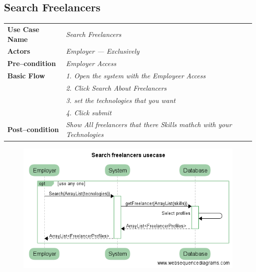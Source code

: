 \documentclass{article}
\begin{document}
\subsection{Search Freelancers}
    \begin{tabular}{ l | l }
    \toprule
      \rowcolor{LightCyan}
      \textbf{Use Case Name}    & \textit{Search Freelancers}\\
      \textbf{Actors}           & \textit{Employer --- Exclusively}\\
      \rowcolor{LightCyan}
      \textbf{Pre--condition}   & \textit{Employer Access}\\
      \textbf{Basic Flow}       & \textit{1. Open the system with the Employeer Access}\\
                                & \textit{2. Click Search About Freelancers}\\
                                & \textit{3. set the technologies that you want}\\
                                & \textit{4. Click submit}\\
      \rowcolor{LightCyan}
      \textbf{Post--condition}  & \textit{Show All freelancers that there Skills mathch with your Technologies}\\
    \toprule
    \end{tabular}

\begin{figure}[ht!]
\centering
\includegraphics[width=128mm]{Search_Freelancers_usecase.png}
\end{figure}
\end{document}
